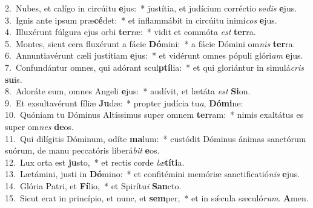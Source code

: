 {2.~}Nubes, et calígo in circúitu \textbf{e}jus:~* justítia, et judícium corréctio se\textit{dis} \textbf{e}jus.\\
{3.~}Ignis ante ipsum præ\textbf{cé}det:~* et inflammábit in circúitu inimí\textit{cos} \textbf{e}jus.\\
{4.~}Illuxérunt fúlgura ejus orbi \textbf{ter}ræ:~* vidit et commóta \textit{est} \textbf{ter}ra.\\
{5.~}Montes, sicut cera fluxérunt a fácie \textbf{Dó}mini:~* a fácie Dómini om\textit{nis} \textbf{ter}ra.\\
{6.~}Annuntiavérunt cæli justítiam \textbf{e}jus:~* et vidérunt omnes pópuli glóri\textit{am} \textbf{e}jus.\\
{7.~}Confundántur omnes, qui adórant scul\textbf{ptí}lia:~* et qui gloriántur in simulá\textit{cris} \textbf{su}is.\\
{8.~}Adoráte eum, omnes Angeli \textbf{e}jus:~* audívit, et lætáta \textit{est} \textbf{Si}on.\\
{9.~}Et exsultavérunt fíliæ \textbf{Ju}dæ:~* propter judícia tu\textit{a}, \textbf{Dó}\textbf{mi}ne:\\
{10.~}Quóniam tu Dóminus Altíssimus super omnem \textbf{ter}ram:~* nimis exaltátus es super om\textit{nes} \textbf{de}os.\\
{11.~}Qui dilígitis Dóminum, odíte \textbf{ma}lum:~* custódit Dóminus ánimas sanctórum suórum, de manu peccatóris liberá\textit{bit} \textbf{e}os.\\
{12.~}Lux orta est \textbf{ju}sto,~* et rectis corde \textit{læ}\textbf{tí}\textbf{ti}a.\\
{13.~}Lætámini, justi in \textbf{Dó}mino:~* et confitémini memóriæ sanctificatió\textit{nis} \textbf{e}jus.\\
{14.~}Glória Patri, et \textbf{Fí}lio,~* et Spirítu\textit{i} \textbf{San}cto.\\
{15.~}Sicut erat in princípio, et nunc, et \textbf{sem}per,~* et in sǽcula sæculó\textit{rum}. \textbf{A}men.\\
